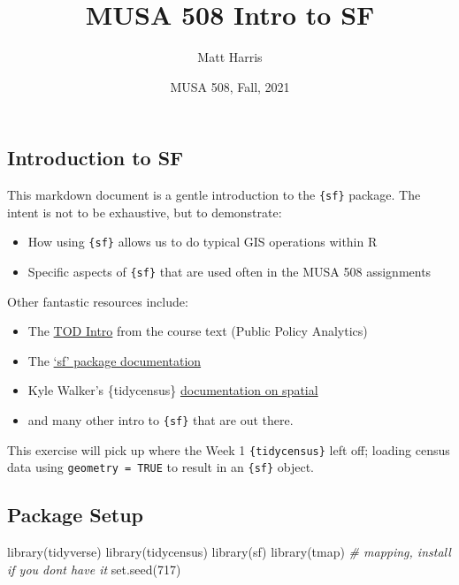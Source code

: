 \documentclass[
]{article}
\title{MUSA 508 Intro to SF}
\author{Matt Harris}
\date{MUSA 508, Fall, 2021}
\newenvironment{Shaded}{\begin{snugshade}}{\end{snugshade}}
\newcommand{\CommentTok}[1]{\textcolor[rgb]{0.56,0.35,0.01}{\textit{#1}}}
\newcommand{\DecValTok}[1]{\textcolor[rgb]{0.00,0.00,0.81}{#1}}
\newcommand{\FunctionTok}[1]{\textcolor[rgb]{0.00,0.00,0.00}{#1}}
\newcommand{\NormalTok}[1]{#1}
\providecommand{\tightlist}{%
  \setlength{\itemsep}{0pt}\setlength{\parskip}{0pt}}
\begin{document}
\maketitle

{
\setcounter{tocdepth}{2}
\tableofcontents
}
\hypertarget{introduction-to-sf}{%
\subsection{Introduction to SF}\label{introduction-to-sf}}

This markdown document is a gentle introduction to the \texttt{\{sf\}}
package. The intent is not to be exhaustive, but to demonstrate:

\begin{itemize}
\tightlist
\item
  How using \texttt{\{sf\}} allows us to do typical GIS operations
  within R
\item
  Specific aspects of \texttt{\{sf\}} that are used often in the MUSA
  508 assignments
\end{itemize}

Other fantastic resources include:

\begin{itemize}
\tightlist
\item
  The
  \href{https://urbanspatial.github.io/PublicPolicyAnalytics/TOD.html\#setup}{TOD
  Intro} from the course text (Public Policy Analytics)
\item
  The \href{https://r-spatial.github.io/sf/index.html}{`sf' package
  documentation}
\item
  Kyle Walker's \{tidycensus\}
  \href{https://walker-data.com/tidycensus/articles/spatial-data.html}{documentation
  on spatial}
\item
  and many other intro to \texttt{\{sf\}} that are out there.
\end{itemize}

This exercise will pick up where the Week 1 \texttt{\{tidycensus\}} left
off; loading census data using \texttt{geometry\ =\ TRUE} to result in
an \texttt{\{sf\}} object.

\hypertarget{package-setup}{%
\subsection{Package Setup}\label{package-setup}}

\begin{Shaded}
\begin{Highlighting}[]
\FunctionTok{library}\NormalTok{(tidyverse)}
\FunctionTok{library}\NormalTok{(tidycensus)}
\FunctionTok{library}\NormalTok{(sf)}
\FunctionTok{library}\NormalTok{(tmap) }\CommentTok{\# mapping, install if you don\textquotesingle{}t have it}
\FunctionTok{set.seed}\NormalTok{(}\DecValTok{717}\NormalTok{)}
\end{Highlighting}
\end{Shaded}
\end{document}
